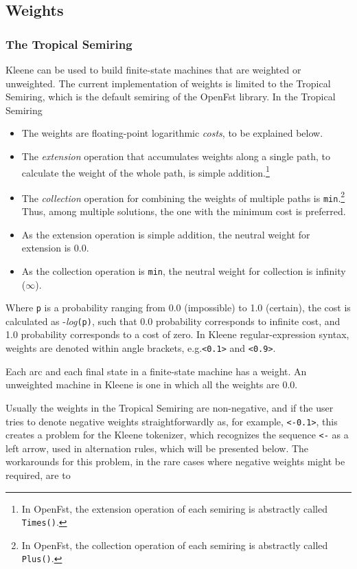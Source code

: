 \subsection{Weights}

\subsubsection{The Tropical Semiring}  

Kleene can be used to build finite-state machines that are weighted or unweighted.
The current implementation of weights is limited to the
Tropical Semiring, which is the default semiring of the OpenFst library.
In the Tropical Semiring

\begin{itemize}
\item
The weights are floating-point logarithmic \emph{costs}, to be explained below.
\item
The \emph{extension} operation that accumulates weights along a single
path, to calculate the weight of the whole path, is simple addition.\footnote{In OpenFst, the extension operation of
each
semiring is abstractly called \texttt{Times()}.}
\item
The \emph{collection} operation for combining the weights of multiple
paths is \texttt{min}.\footnote{In OpenFst, the collection
operation of each semiring is abstractly called \texttt{Plus()}.}
Thus, among multiple solutions, the one with the minimum cost is preferred.
\item
As the extension operation is simple addition, the neutral weight for extension is 0.0.  
\item
As the collection operation is \texttt{min}, the neutral weight for collection is infinity ($\infty$).
\end{itemize}

\noindent
Where \texttt{p} is a probability ranging from 0.0 (impossible) to
1.0 (certain), the cost is calculated as -\emph{log}\texttt{(p)},
such that 0.0 probability corresponds to infinite cost, and 1.0
probability corresponds to a cost of zero.
In Kleene regular-expression syntax, weights are denoted within angle brackets,
e.g.\@ \texttt{<0.1>} and \texttt{<0.9>}. 

Each arc and each final state in a finite-state machine has a weight.  An unweighted
machine in Kleene is one in which all the weights are 0.0.

Usually the weights in
the Tropical Semiring are non-negative, and if the user tries to
denote negative weights straightforwardly as, for example, \@ \texttt{<-0.1>}, this
creates a problem for the Kleene tokenizer, which recognizes the
sequence \texttt{<-} as a left arrow, used in alternation rules, which
will be presented below.
The workarounds for this problem, in the rare cases where negative
weights might be required,
are to

